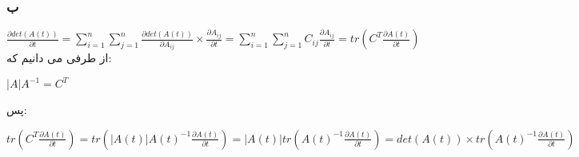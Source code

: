 \subsubsection*{ب}

\setLTR
$
\frac{\partial det(A(t))}{\partial t} = \sum_{i=1}^{n} \sum_{j=1}^{n} \frac{\partial det(A(t))}{\partial A_{ij}} \times \frac{\partial A_{ij}}{\partial t} = \sum_{i=1}^{n} \sum_{j=1}^{n} C_{ij} \frac{\partial A_{ij}}{\partial t} = tr(C^T\frac{\partial A(t)}{\partial t})
$
\setRTL
از طرفی می دانیم که:

\setLTR
$
|A|A^{-1} = C^T
$
\setRTL

پس:

\setLTR
$
 tr(C^T\frac{\partial A(t)}{\partial t}) = tr(|A(t)|A(t)^{-1}\frac{\partial A(t)}{\partial t}) = |A(t)|tr(A(t)^{-1}\frac{\partial A(t)}{\partial t}) = det(A(t)) \times tr(A(t)^{-1}\frac{\partial A(t)}{\partial t})
$
\setRTL